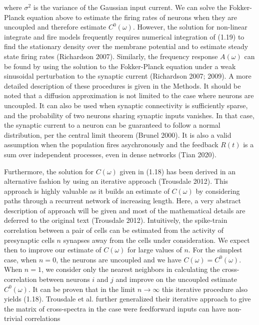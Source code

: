 \documentclass{ucetd}
\begin{document}
where $\sigma^{2}$ is the variance of the Gaussian input current. We can solve the Fokker-Planck equation above to estimate the firing rates of neurons when they are uncoupled and therefore estimate $C^{0}(\omega)$. However, the solution for non-linear integrate and fire models frequently requires numerical integration of (1.19) to find the stationary density over the membrane potential and to estimate steady state firing rates (Richardson 2007). Similarly, the frequency response $A(\omega)$ can be found by using the solution to the Fokker-Planck equation under a weak sinusoidal perturbation to the synaptic current (Richardson 2007; 2009). A more detailed description of these procedures is given in the Methods. It should be noted that a diffusion approximation is not limited to the case where neurons are uncoupled. It can also be used when synaptic connectivity is sufficiently sparse, and the probability of two neurons sharing synaptic inputs vanishes. In that case, the synaptic current to a neuron can be guaranteed to follow a normal distribution, per the central limit theorem (Brunel 2000).  It is also a valid assumption when the population fires asychronously and the feedback $R(t)$ is a sum over independent processes, even in dense networks (Tian 2020).

Furthermore, the solution for $C(\omega)$ given in (1.18) has been derived in an alternative fashion by using an iterative approach (Trousdale 2012). This approach is highly valuable as it builds an estimate of $C(\omega)$ by considering paths through a recurrent network of increasing length. Here, a very abstract description of approach will be given and most of the mathematical details are deferred to the original text (Trousdale 2012). Intuitively, the spike-train correlation between a pair of cells can be estimated from the activity of presynaptic cells $n$ synapses away from the cells under consideration. We expect then to improve our estimate of $C(\omega)$ for large values of $n$. For the simplest case, when $n=0$, the neurons are uncoupled and we have $C(\omega) = C^{0}(\omega)$. When $n=1$, we consider only the nearest neighbors in calculating the cross-correlation between neurons $i$ and $j$ and improve on the uncoupled estimate $C^{0}(\omega)$. It can be proven that in the limit $n\rightarrow\infty$ this iterative procedure also yields (1.18). Trousdale et al. further generalized their iterative approach to give the matrix of cross-spectra in the case were feedforward inputs can have non-trivial correlations
\end{document}
